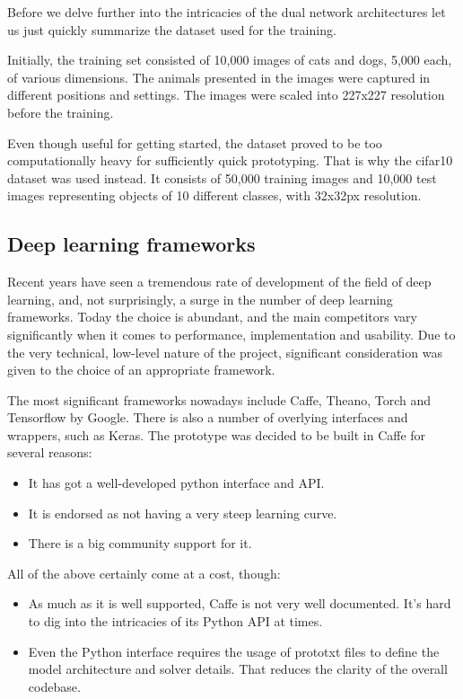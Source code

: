 \documentclass[a4paper, 12pt]{article}
\numberwithin{equation}{section}
\begin{document}
	Before we delve further into the intricacies of the dual network architectures let us just quickly summarize the dataset used for the training.
	
	Initially, the training set consisted of 10,000 images of cats and dogs, 5,000 each, of various dimensions. The animals presented in the images were captured in different positions and settings. The images were scaled into 227x227 resolution before the training.
	
	Even though useful for getting started, the dataset proved to be too computationally heavy for sufficiently quick prototyping. That is why the cifar10 dataset was used instead. It consists of 50,000 training images and 10,000 test images representing objects of 10 different classes, with 32x32px resolution.
	
	\subsection{Deep learning frameworks}
	Recent years have seen a tremendous rate of development of the field of deep learning, and, not surprisingly, a surge in the number of deep learning frameworks. Today the choice is abundant, and the main competitors vary significantly when it comes to performance, implementation and usability. Due to the very technical, low-level nature of the project, significant consideration was given to the choice of an appropriate framework.
	
	The most significant frameworks nowadays include Caffe, Theano, Torch and Tensorflow by Google. There is also a number of overlying interfaces and wrappers, such as Keras. The prototype was decided to be built in Caffe for several reasons:
	
	\begin{itemize}
		\item It has got a well-developed python interface and API.
		\item It is endorsed as not having a very steep learning curve.
		\item There is a big community support for it.
	\end{itemize}
	
	All of the above certainly come at a cost, though:
	
	\begin{itemize}
		\item As much as it is well supported, Caffe is not very well documented. It's hard to dig into the intricacies of its Python API at times.
		\item Even the Python interface requires the usage of prototxt files to define the model architecture and solver details. That reduces the clarity of the overall codebase.
	\end{itemize}
	
\end{document}
